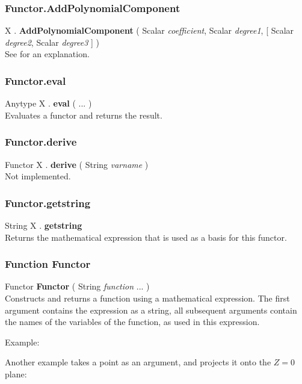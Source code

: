 \subsubsection{Functor.AddPolynomialComponent \label{F:Functor:AddPolynomialComponent}}
X . \textbf{AddPolynomialComponent} ( Scalar \textit{coefficient}, Scalar \textit{degree1},  [ Scalar \textit{degree2}, Scalar \textit{degree3} ] ) \\
See  for an explanation.

\subsubsection{Functor.eval \label{F:Functor:eval}}
Anytype X . \textbf{eval} (  ...  ) \\
Evaluates a functor and returns the result.

\subsubsection{Functor.derive \label{F:Functor:derive}}
Functor X . \textbf{derive} ( String \textit{varname} ) \\
Not implemented.

\subsubsection{Functor.getstring \label{F:Functor:getstring}}
String X . \textbf{getstring} \\
Returns the mathematical expression that is used as a basis for this functor.

\subsubsection{Function Functor \label{F:Functor}}
Functor \textbf{Functor} ( String \textit{function} ...  ) \\
Constructs and returns a function using a mathematical expression. The first argument contains the expression as a string, all subsequent arguments contain the names of the variables of the function, as used in this expression.

Example: \\

Another example takes a point as an argument, and projects it onto the $Z=0$ plane: \\




